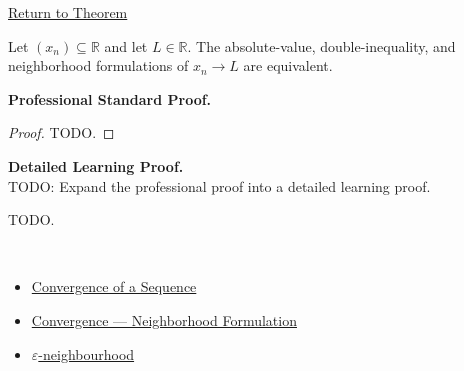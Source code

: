 \newpage
{}
\label{prf:equivalence-of-convergence-formulations}

\begin{remark*}[Return]
\hyperref[thm:equivalence-of-convergence-formulations]{Return to Theorem}
\end{remark*}

\begin{theorem*}
Let $(x_n) \subseteq \mathbb{R}$ and let $L \in \mathbb{R}$. The
absolute-value, double-inequality, and neighborhood formulations of
$x_n \to L$ are equivalent.
\end{theorem*}

\textbf{Professional Standard Proof.}~\\
\begin{proof}
TODO.
\end{proof}

\textbf{Detailed Learning Proof.}~\\
TODO: Expand the professional proof into a detailed learning proof.


\begin{remark*}
TODO.
\end{remark*}

\begin{remark*}[Dependencies]~\\
\begin{itemize}
  \item \hyperref[def:convergent-sequence]{Convergence of a Sequence}
  \item \hyperref[def:convergent-sequence-neighborhood]{Convergence --- Neighborhood Formulation}
  \item \hyperref[def:epsilon-neighbourhood]{$\varepsilon$-neighbourhood}
\end{itemize}
\end{remark*}
